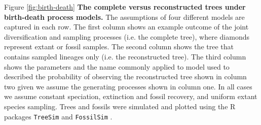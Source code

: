 \documentclass[11pt]{article}
\begin{document}
\clearpage


Figure \ref{fig:birth-death} \textbf{The complete versus reconstructed trees under birth-death process models.}
The assumptions of four different models are captured in each row.
The first column shows an example outcome of the joint diversification and sampling processes (i.e. the complete tree), where diamonds represent  extant or fossil samples.
The second column shows the tree that contains sampled lineages only (i.e. the reconstructed tree). 
The third column shows the parameters and the name commonly applied to model used to described the probability of observing the reconstructed tree shown in column two given we assume the generating processes shown in column one.
In all cases we assume constant speciation, extinction and fossil recovery, and uniform extant species sampling.
Trees and fossils were simulated and plotted using the R packages \texttt{TreeSim} \cite{Stadler2011} and \texttt{FossilSim} \cite{BaridoSottani2019b}.

\clearpage



\end{document}
